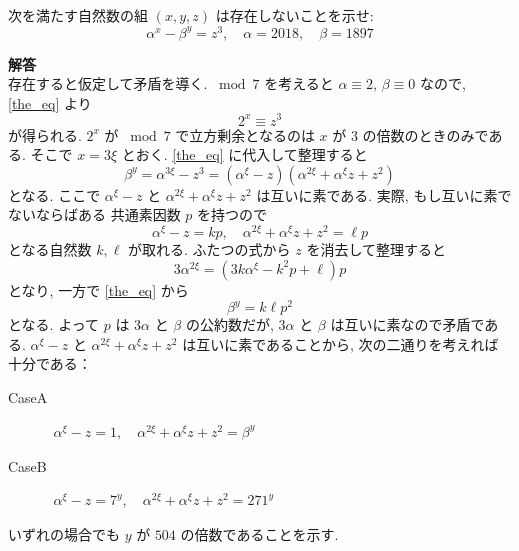  \begin{screen}
      次を満たす自然数の組 $(x, y, z)$ は存在しないことを示せ:
      \begin{equation}
        \alpha^{x} - \beta^{y} = z^{3}, \quad
        \alpha = 2018, \quad \beta = 1897
        \label{the_eq}
        \tag{$*$}
      \end{equation}

  \end{screen}
\textbf{解答}\\
    存在すると仮定して矛盾を導く. ${}\bmod{7}$ を考えると
    $\alpha \equiv 2$, $\beta \equiv 0$ なので,
    \eqref{the_eq} より
    \[
      2^{x} \equiv z^{3}
    \]
    が得られる. $2^{x}$ が ${}\bmod{7}$ で立方剰余となるのは
    $x$ が $3$ の倍数のときのみである. そこで $x = 3 \xi$ とおく.
    \eqref{the_eq} に代入して整理すると
    \[
      \beta^{y}
      = \alpha^{3 \xi} - z^{3}
      = (\alpha^{\xi} - z)
        (\alpha^{2\xi} + \alpha^{\xi}z + z^{2})
    \]
    となる. ここで 
    $\alpha^{\xi} - z$ 
    と
    $\alpha^{2\xi} + \alpha^{\xi}z + z^{2}$
    は互いに素である. 実際, もし互いに素でないならばある
    共通素因数 $p$ を持つので
    \[
      \alpha^{\xi} - z = k p, \quad
      \alpha^{2\xi} + \alpha^{\xi}z + z^{2} = \ell p
    \]
    となる自然数 $k, \ell$ が取れる. ふたつの式から $z$ を消去して整理すると
    \[
      3 \alpha^{2\xi} 
      = (3 k \alpha^{\xi} - k^{2} p + \ell) p
    \]
    となり, 一方で \eqref{the_eq} から
    \[
      \beta^{y} = k \ell p^{2}
    \]
    となる. よって $p$ は $3 \alpha$ と $\beta$ の公約数だが,
    $3 \alpha$ と $\beta$ は互いに素なので矛盾である.
    $\alpha^{\xi} - z$ 
    と
    $\alpha^{2\xi} + \alpha^{\xi}z + z^{2}$
    は互いに素であることから, 次の二通りを考えれば十分である：
    \begin{description}
      \item[ CaseA] 
      $\begin{aligned}
        \alpha^{\xi} - z = 1, \quad
        \alpha^{2\xi} + \alpha^{\xi} z + z^{2} = \beta^{y}
      \end{aligned}$
      \item[CaseB]
      $\begin{aligned}
        \alpha^{\xi} - z = 7^{y}, \quad
        \alpha^{2\xi} + \alpha^{\xi} z + z^{2} = 271^{y}
      \end{aligned}$
    \end{description}
    いずれの場合でも $y$ が $504$ の倍数であることを示す.
